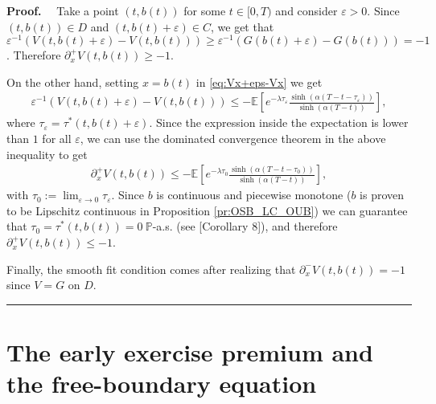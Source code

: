 \documentclass{tufte-handout}
\newcommand{\E}{\mathbb{E}} %
\renewcommand{\Pr}{\mathbb{P}} %
\newenvironment{pf}[1][Proof]{\textbf{#1.} }{\ \rule{0.5em}{0.5em}}
\begin{document}
	\begin{pf}
		\ \ Take a point $(t, b(t))$ for some $t\in[0, T)$ and consider $\varepsilon > 0$. Since $(t, b(t)) \in D$ and $(t, b(t) + \varepsilon) \in C$, we get that $\varepsilon^{-1}(V(t, b(t) + \varepsilon) - V(t, b(t))) \geq \varepsilon^{-1}(G(b(t) + \varepsilon) - G(b(t))) = -1$. Therefore $\partial_x^+V(t, b(t)) \geq -1$. 
		
		On the other hand, setting $x = b(t)$ in \eqref{eq:Vx+eps-Vx} we get
		\begin{align*}
		\varepsilon^{-1}(V(t, b(t) + \varepsilon) - V(t, b(t))) \leq -\E\left[e^{-\lambda\tau_\varepsilon}\frac{\sinh(\alpha (T - t - \tau_\varepsilon))}{\sinh(\alpha (T - t))}\right],
		\end{align*}
		where $\tau_\varepsilon = \tau^*(t, b(t) + \varepsilon)$. Since the expression inside the expectation is lower than $1$ for all $\varepsilon$, we can use the dominated convergence theorem in the above inequality to get
		 \begin{align}
		 \partial_x^+V(t, b(t)) \leq -\E\left[e^{-\lambda\tau_0}\frac{\sinh(\alpha (T - t - \tau_0))}{\sinh(\alpha (T - t))}\right],
		 \end{align}
		with $\tau_0 := \lim_{\varepsilon\rightarrow0} \tau_\varepsilon$. Since $b$ is continuous and piecewise monotone ($b$ is proven to be Lipschitz continuous in Proposition \ref{pr:OSB_LC_OUB}) we can guarantee that $\tau_0 = \tau^{*}(t, b(t)) = 0\ \Pr$-a.s. (see \citet{cox_embedding_2015}[Corollary 8]), and therefore $\partial_x^+V(t, b(t)) \leq -1$.
			
		Finally, the smooth fit condition comes after realizing that $\partial_x^-V(t, b(t)) = -1$ since $V = G$ on $D$.   
	\end{pf}

	\section{The early exercise premium and the free-boundary equation}
	
\end{document}
